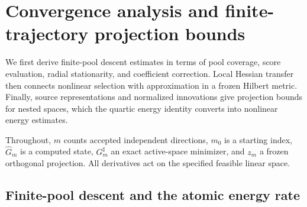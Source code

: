 \documentclass[11pt]{article}
\def\CGAChapterFiveStandalone{1}
\theoremstyle{remark}\newtheorem{remark}[theorem]{Remark}
\begin{document}
\setcounter{section}{3}
\fi
\providecommand{\cE}{\mathcal E}
\providecommand{\cD}{\mathcal D}
\providecommand{\cP}{\mathcal P}
\providecommand{\cK}{\mathcal K}
\providecommand{\cnorm}[1]{\left\lVert#1\right\rVert}
\providecommand{\cabs}[1]{\left|#1\right|}
\providecommand{\abs}[1]{\left|#1\right|}
\providecommand{\cinner}[2]{\left\langle#1,#2\right\rangle}
\providecommand{\cR}{\mathbb R}
\providecommand{\cdd}{\,\mathrm d}
\ifdefined\CGAChapterFiveStandalone
  \newcommand{\CGAHLDreference}{the finite-pool descent estimates}
  \newcommand{\CGAEnergyMetricReference}{the energy--distance theorem and metric corollary in the main text}
  \newcommand{\CGAEnergyTheoremReference}{the energy--distance theorem in the main text}
\else
  \newcommand{\CGAHLDreference}{Section~\ref{sec:c5-descent}}
  \newcommand{\CGAEnergyMetricReference}{Theorem~\ref{thm:energy-v} and Corollary~\ref{cor:metric-rates}}
  \newcommand{\CGAEnergyTheoremReference}{Theorem~\ref{thm:energy-v}}
\fi

\section{Convergence analysis and finite-trajectory projection bounds}
\label{sec:c5}

We first derive finite-pool descent estimates in terms of pool coverage, score evaluation, radial stationarity, and coefficient correction. Local Hessian transfer then connects nonlinear selection with approximation in a frozen Hilbert metric. Finally, source representations and normalized innovations give projection bounds for nested spaces, which the quartic energy identity converts into nonlinear energy estimates.

Throughout, $m$ counts accepted independent directions, $m_0$ is a starting
index, $\widehat G_m$ is a computed state, $G_m^\sharp$ an exact active-space
minimizer, and $z_m$ a frozen orthogonal projection.  All derivatives act on
the specified feasible linear space.

\subsection{Finite-pool descent and the atomic energy rate}
\label{sec:c5-descent}
\label{sec:descent}
\end{document}

